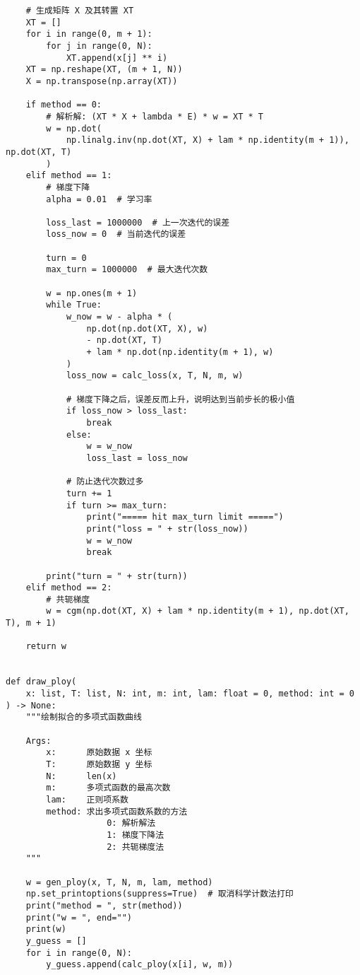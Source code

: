 \begin{verbatim}
    # 生成矩阵 X 及其转置 XT
    XT = []
    for i in range(0, m + 1):
        for j in range(0, N):
            XT.append(x[j] ** i)
    XT = np.reshape(XT, (m + 1, N))
    X = np.transpose(np.array(XT))

    if method == 0:
        # 解析解: (XT * X + lambda * E) * w = XT * T
        w = np.dot(
            np.linalg.inv(np.dot(XT, X) + lam * np.identity(m + 1)), np.dot(XT, T)
        )
    elif method == 1:
        # 梯度下降
        alpha = 0.01  # 学习率

        loss_last = 1000000  # 上一次迭代的误差
        loss_now = 0  # 当前迭代的误差

        turn = 0
        max_turn = 1000000  # 最大迭代次数

        w = np.ones(m + 1)
        while True:
            w_now = w - alpha * (
                np.dot(np.dot(XT, X), w)
                - np.dot(XT, T)
                + lam * np.dot(np.identity(m + 1), w)
            )
            loss_now = calc_loss(x, T, N, m, w)

            # 梯度下降之后，误差反而上升，说明达到当前步长的极小值
            if loss_now > loss_last:
                break
            else:
                w = w_now
                loss_last = loss_now

            # 防止迭代次数过多
            turn += 1
            if turn >= max_turn:
                print("===== hit max_turn limit =====")
                print("loss = " + str(loss_now))
                w = w_now
                break

        print("turn = " + str(turn))
    elif method == 2:
        # 共轭梯度
        w = cgm(np.dot(XT, X) + lam * np.identity(m + 1), np.dot(XT, T), m + 1)

    return w


def draw_ploy(
    x: list, T: list, N: int, m: int, lam: float = 0, method: int = 0
) -> None:
    """绘制拟合的多项式函数曲线

    Args:
        x:      原始数据 x 坐标
        T:      原始数据 y 坐标
        N:      len(x)
        m:      多项式函数的最高次数
        lam:    正则项系数
        method: 求出多项式函数系数的方法
                    0: 解析解法
                    1: 梯度下降法
                    2: 共轭梯度法
    """

    w = gen_ploy(x, T, N, m, lam, method)
    np.set_printoptions(suppress=True)  # 取消科学计数法打印
    print("method = ", str(method))
    print("w = ", end="")
    print(w)
    y_guess = []
    for i in range(0, N):
        y_guess.append(calc_ploy(x[i], w, m))


\end{verbatim}
